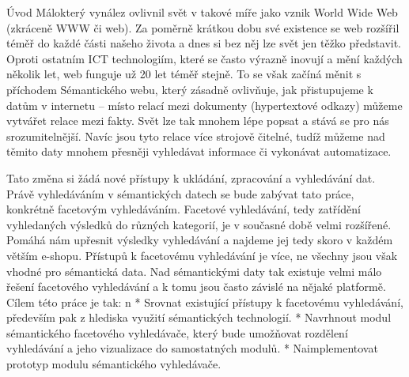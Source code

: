 \chap Úvod
Málokterý vynález ovlivnil svět v takové míře jako vznik World Wide Web (zkráceně WWW či web). Za poměrně krátkou dobu své existence se web rozšířil téměř do každé části našeho života a dnes si bez něj 
lze svět jen těžko představit. Oproti ostatním ICT technologiím, které se často výrazně inovují a mění každých několik let, web funguje už 20 let téměř stejně.
To se však začíná měnit s příchodem Sémantického webu, který zásadně ovlivňuje, jak přistupujeme k datům v internetu – místo relací mezi dokumenty (hypertextové odkazy) můžeme vytvářet relace mezi fakty. 
Svět lze tak mnohem lépe popsat a stává se pro nás srozumitelnější. Navíc jsou tyto relace více strojově čitelné, tudíž můžeme nad těmito daty mnohem přesněji vyhledávat informace či vykonávat automatizace. 


Tato změna si žádá nové přístupy k ukládání, zpracování a vyhledávání dat. Právě vyhledáváním v sémantických datech se bude zabývat tato práce, konkrétně facetovým vyhledáváním. Facetové vyhledávání, tedy 
zatřídění vyhledaných výsledků do různých kategorií, je v současné době velmi rozšířené. Pomáhá nám upřesnit výsledky vyhledávání a najdeme jej tedy skoro v každém větším e-shopu. Přístupů k facetovému vyhledávání je více, ne 
všechny jsou však vhodné pro sémantická data. Nad sémantickými daty tak existuje velmi málo řešení facetového vyhledávání a k tomu jsou často závislé na nějaké platformě.
Cílem této práce je tak:
\begitems \style n
* Srovnat existující přístupy k facetovému vyhledávání, především pak z hlediska využití sémantických technologií.
* Navrhnout modul sémantického facetového vyhledávače, který bude umožňovat rozdělení vyhledávání a jeho vizualizace do samostatných modulů.
* Naimplementovat prototyp modulu sémantického vyhledávače.
\enditems